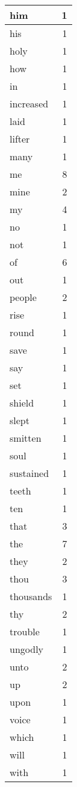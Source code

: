\begin{center}
\begin{longtable}{l|r}
him & 1 \\ \hline
his & 1 \\ \hline
holy & 1 \\ \hline
how & 1 \\ \hline
in & 1 \\ \hline
increased & 1 \\ \hline
laid & 1 \\ \hline
lifter & 1 \\ \hline
many & 1 \\ \hline
me & 8 \\ \hline
mine & 2 \\ \hline
my & 4 \\ \hline
no & 1 \\ \hline
not & 1 \\ \hline
of & 6 \\ \hline
out & 1 \\ \hline
people & 2 \\ \hline
rise & 1 \\ \hline
round & 1 \\ \hline
save & 1 \\ \hline
say & 1 \\ \hline
set & 1 \\ \hline
shield & 1 \\ \hline
slept & 1 \\ \hline
smitten & 1 \\ \hline
soul & 1 \\ \hline
sustained & 1 \\ \hline
teeth & 1 \\ \hline
ten & 1 \\ \hline
that & 3 \\ \hline
the & 7 \\ \hline
they & 2 \\ \hline
thou & 3 \\ \hline
thousands & 1 \\ \hline
thy & 2 \\ \hline
trouble & 1 \\ \hline
ungodly & 1 \\ \hline
unto & 2 \\ \hline
up & 2 \\ \hline
upon & 1 \\ \hline
voice & 1 \\ \hline
which & 1 \\ \hline
will & 1 \\ \hline
with & 1 \\ \hline
\end{longtable}
\end{center}



